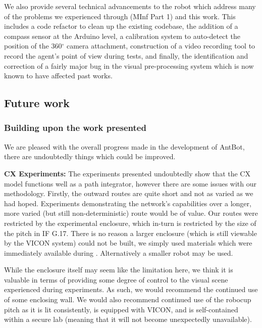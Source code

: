 \documentclass[a4paper,11pt,twoside,openright]{article}
\begin{document}
We also provide several technical advancements to the robot which
address many of the problems we experienced through
\cite{Mitchell2018} (MInf Part 1) and this work. This includes a code refactor to
clean up the existing codebase, the addition of a compass sensor at
the Arduino level, a calibration system to auto-detect the position of
the 360$^\circ$ camera attachment, construction of a video recording
tool to record the agent's point of view during tests, and finally,
the identification and correction of a fairly major bug in the visual
pre-processing system which is now known to have affected past works.

\subsection{Future work}
\subsubsection{Building upon the work presented}\label{sec:future}
We are pleased with the overall progress made in the development of
AntBot, there are undoubtedly things which could be
improved.\newline\par

\textbf{CX Experiments:} The experiments presented undoubtedly show
that the CX model functions well as a path integrator, however there
are some issues with our methodology. Firstly, the outward routes are
quite short and not as varied as we had hoped. Experiments
demonstrating the network's capabilities over a longer, more varied
(but still non-deterministic) route would be of value. Our routes were
restricted by the experimental enclosure, which in-turn is restricted
by the size of the pitch in IF G.17. There is no reason a larger
enclosure (which is still viewable by the VICON system) could not be
built, we simply used materials which were immediately available
during \cite{Mitchell2018}. Alternatively a smaller robot may be used.
\newline\par

While the enclosure itself may seem like the limitation here, we think
it is valuable in terms of providing some degree of control to the
visual scene experienced during experiments. As such, we would
recommend the continued use of some enclosing wall. We would also
recommend continued use of the robocup pitch as it is lit
consistently, is equipped with VICON, and is self-contained within a
secure lab (meaning that it will not become unexpectedly unavailable).
\newline\par
\end{document}
